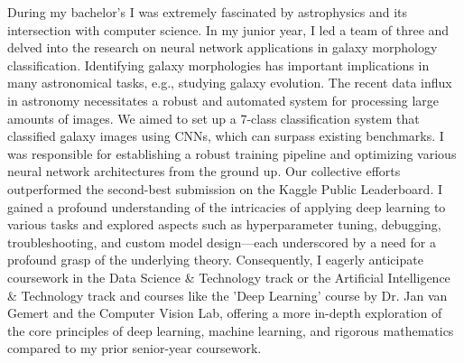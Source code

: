 \documentclass{article}
\begin{document}
\vspace{5pt}
\hspace{0.25in}During my bachelor’s I was extremely fascinated by astrophysics
and its intersection with computer science. In my junior year, I led a team of
three and delved into the research on neural network applications in galaxy
morphology classification. Identifying galaxy morphologies has important
implications in many astronomical tasks, e.g., studying galaxy evolution. The
recent data influx in astronomy necessitates a robust and automated system for
processing large amounts of images. We aimed to set up a 7-class classification
system that classified galaxy images using CNNs, which can surpass existing
benchmarks. I was responsible for establishing a robust training pipeline and
optimizing various neural network architectures from the ground up. Our
collective efforts outperformed the second-best submission on the Kaggle Public
Leaderboard. I gained a profound understanding of the intricacies of applying
deep learning to various tasks and explored aspects such as hyperparameter
tuning, debugging, troubleshooting, and custom model design—each underscored by
a need for a profound grasp of the underlying theory. Consequently, I eagerly
anticipate coursework in the Data Science \& Technology track or the Artificial
Intelligence \& Technology track and courses like the 'Deep Learning' course by
Dr. Jan van Gemert and the Computer Vision Lab, offering a more in-depth
exploration of the core principles of deep learning, machine learning, and
rigorous mathematics compared to my prior senior-year coursework.
\end{document}
